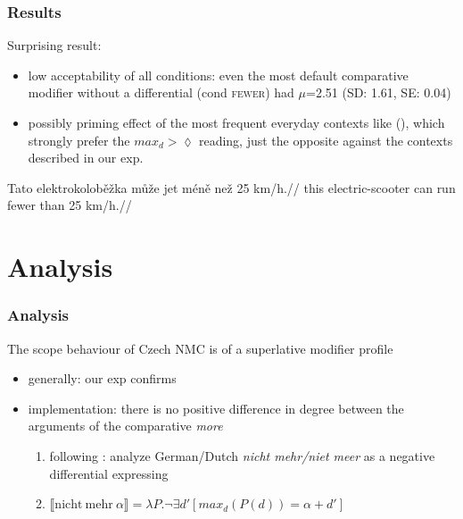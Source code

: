 \documentclass[10pt
]{beamer}
\newcommand{\cond}[1]{\textsc{#1}}
\newcommand{\sem}[1]{\llbracket{#1}\rrbracket}
\begin{document}
\begin{frame}
  \frametitle{Results}

  Surprising result:
  
  \begin{itemize}
    \item low acceptability of all conditions: even the most default comparative modifier without a differential (cond \cond{fewer}) had $\mu$=2.51 (SD: 1.61, SE: 0.04)
    \item possibly priming effect of the most frequent everyday contexts like (\nextx), which strongly prefer the $max_d > \lozenge$ reading, just the opposite against the contexts described in our exp. 

  \end{itemize}

\ex 
\begingl
\gla Tato elektrokoloběžka může jet méně než 25 km/h.//
\glb this electric-scooter can run fewer than 25 km/h.//
\endgl
\xe

\end{frame}

\section{Analysis}

\begin{frame}
  \frametitle{Analysis}

  The scope behaviour of Czech NMC is of a superlative modifier profile
  
  \begin{itemize}
    \item generally: our exp confirms \cite{kennedy2015fregean}
    \item implementation:  there is no positive difference in degree between the arguments of the comparative \textit{more}
    
    \begin{enumerate}
      \item following \cite{nouwen2008upper}: analyze German/Dutch \textit{nicht mehr/niet meer} as a negative differential expressing  
      \item $\sem{\mathrm{nicht\ mehr\ }\alpha}=\lambda P.\neg \exists d'[max_d(P(d)) = \alpha + d']$ 
    \end{enumerate}

  \end{itemize}
  
\end{frame}
\end{document}
